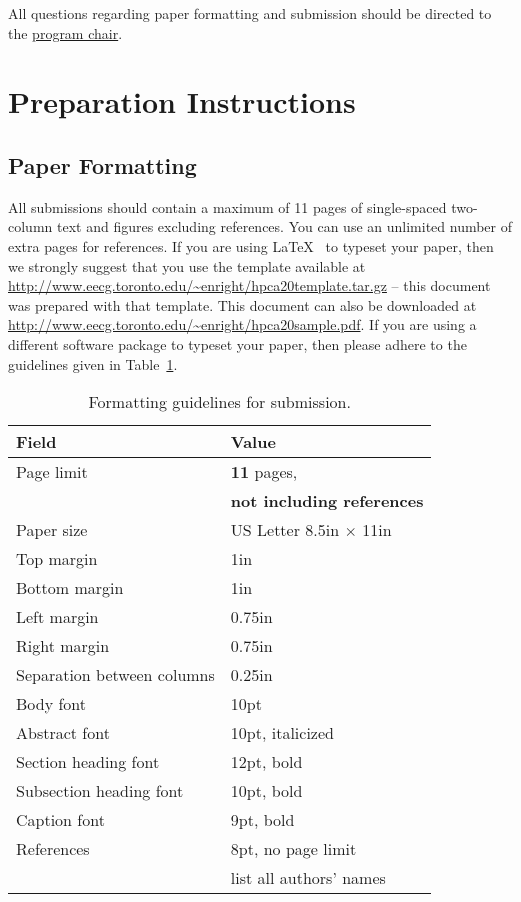 \documentclass[pageno]{jpaper}
\begin{document}
All questions regarding paper formatting and submission should be directed to
the \href{mailto:enright@eecg.toronto.edu}{program chair}.

\section{Preparation Instructions}

\subsection{Paper Formatting}

All submissions should contain a maximum of 11 pages of single-spaced
two-column text and figures excluding references. You can use an unlimited number of extra pages for references.
If you are using \LaTeX~\cite{lamport94}
to typeset your paper, then we
strongly suggest
that you use the template available at
\url{http://www.eecg.toronto.edu/~enright/hpca20template.tar.gz} -- this
document was prepared with that template.  This document can
also be downloaded at \url{http://www.eecg.toronto.edu/~enright/hpca20sample.pdf}.
If you are using a different
software package to typeset your paper, then please adhere to the guidelines
given in Table~\ref{table:formatting}.

\begin{table}[h!]
  \centering
  \begin{tabular}{|l|l|}
    \hline
    \textbf{Field} & \textbf{Value}\\
    \hline
    \hline
    Page limit & {\bf 11} pages, \\
& {\bf not including references}\\
    \hline
    Paper size & US Letter 8.5in $\times$ 11in\\
    \hline
    Top margin & 1in\\
    \hline
    Bottom margin & 1in\\
    \hline
    Left margin & 0.75in\\
    \hline
    Right margin & 0.75in\\
    \hline
    Separation between columns & 0.25in\\
    \hline
    Body font & 10pt\\
    \hline
    Abstract font & 10pt, italicized\\
    \hline
    Section heading font & 12pt, bold\\
    \hline
    Subsection heading font & 10pt, bold\\
    \hline
    Caption font & 9pt, bold\\
    \hline
    References & 8pt, no page limit\\
& list all authors' names \\
    \hline
  \end{tabular}
  \caption{Formatting guidelines for submission.}
  \label{table:formatting}
\end{table}
\end{document}
